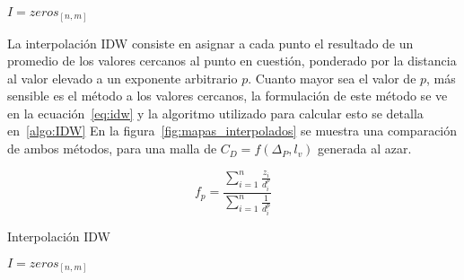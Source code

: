 {\begin{algorithm}
    \BlankLine
     $I=zeros_{[n,m]}$\;
\end{algorithm}

La interpolación IDW consiste en asignar a cada punto el resultado de un
promedio de los valores cercanos al punto en cuestión, ponderado por la
distancia al valor elevado a un exponente arbitrario $p$.
%
Cuanto mayor sea el valor de $p$, más sensible es el método a los valores
cercanos, la formulación de este método se ve en la ecuación~\ref{eq:idw} y la
algoritmo utilizado para calcular esto se detalla en~\ref{algo:IDW}
%
En la figura~\ref{fig:mapas_interpolados} se muestra una comparación de ambos
métodos, para una malla de $C_{D}=f(\Delta_{P}, l_{v})$ generada al azar.


\begin{equation} \label{eq:idw}
    f_p = \frac{\sum_{i=1}^{n} \frac{z_i}{d_i^p}} {\sum_{i=1}^{n}
    \frac{1}{d_i^p}}
\end{equation}


\begin{algorithm}
    \caption{Interpolación IDW}\label{algo:IDW}


    \BlankLine
    $I=zeros_{[n,m]}$\;
\end{algorithm}

}

